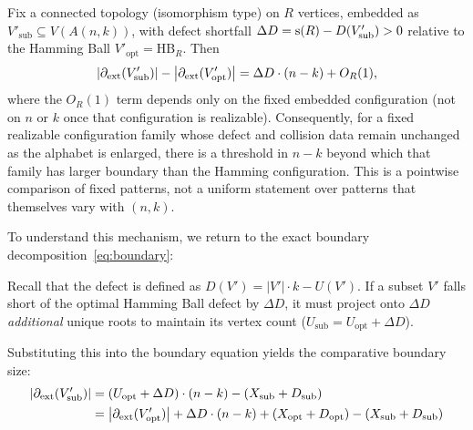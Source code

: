 \begin{theorem}\label{thm:penalty}
Fix a connected topology (isomorphism type) on $R$ vertices, embedded as
$V'_{\mathrm{sub}} \subseteq V(A(n,k))$, with defect shortfall $\Delta D =
\mathrm{s}(R) - D(V'_{\mathrm{sub}}) > 0$ relative to the Hamming Ball
$V'_{\mathrm{opt}} = \mathrm{HB}_R$. Then
	\begin{equation}\label{eq:penalty-asymptotic}
		\left| \partial_{\mathrm{ext}}(V'_{\mathrm{sub}}) \right| - \left| \partial_{\mathrm{ext}}(V'_{\mathrm{opt}}) \right| = \Delta D \cdot (n-k) + O_R(1),
	\end{equation}
where the $O_R(1)$ term depends only on the fixed embedded configuration (not
on $n$ or $k$ once that configuration is realizable).
Consequently, for a fixed realizable configuration family whose defect and
collision data remain unchanged as the alphabet is enlarged, there is a
threshold in $n-k$ beyond which that family has larger boundary than the
Hamming configuration. This is a pointwise comparison of fixed patterns, not
a uniform statement over patterns that themselves vary with $(n,k)$.
\end{theorem}
To understand this mechanism, we return to the exact boundary
decomposition~\eqref{eq:boundary}:

Recall that the defect is defined as $D(V') = |V'| \cdot k - U(V')$. If a subset
$V'$ falls short of the optimal Hamming Ball defect by $\Delta D$, it must
project onto $\Delta D$ \emph{additional} unique roots to maintain its vertex
count ($U_{\mathrm{sub}} = U_{\mathrm{opt}} + \Delta D$).

Substituting this into the boundary equation yields the comparative boundary
size:
\begin{align}\label{eq:penalty-expansion}
	\left| \partial_{\mathrm{ext}}(V'_{\mathrm{sub}}) \right| & = (U_{\mathrm{opt}} + \Delta D) \cdot (n - k) - (X_{\mathrm{sub}} + D_{\mathrm{sub}}) \nonumber                                                     \\
	                                         & = \left| \partial_{\mathrm{ext}}(V'_{\mathrm{opt}}) \right| + \Delta D \cdot (n - k) + (X_{\mathrm{opt}} + D_{\mathrm{opt}}) - (X_{\mathrm{sub}} + D_{\mathrm{sub}})
\end{align}


